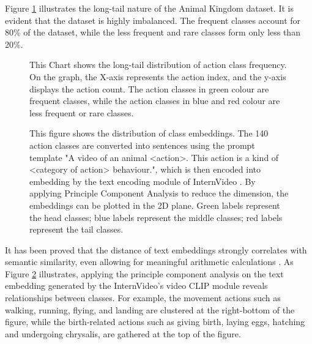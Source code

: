 Figure \ref{fig:1_1_LongTail} illustrates the long-tail nature of the Animal Kingdom dataset. It is evident that the dataset is highly imbalanced. The frequent classes account for 80\% of the dataset, while the less frequent and rare classes form only less than 20\%.

\begin{figure}[ht]
    \centering
    \resizebox{1.0\textwidth}{!}{}
    \caption[Action Classes Frequency Distribution]{This Chart shows the long-tail distribution of action class frequency. On the graph, the X-axis represents the action index, and the y-axis displays the action count. The action classes in green colour are frequent classes, while the action classes in blue and red colour are less frequent or rare classes.}
    \label{fig:1_1_LongTail}
\end{figure}

\begin{figure}[ht]
    \centering
    \caption[Class Embedding Distribution]{This figure shows the distribution of class embeddings. The 140 action classes are converted into sentences using the prompt template "A video of an animal <action>. This action is a kind of <category of action> behaviour.", which is then encoded into embedding by the text encoding module of InternVideo \parencite{wang2022internvideo}. By applying Principle Component Analysis to reduce the dimension, the embeddings can be plotted in the 2D plane. Green labels represent the head classes; blue labels represent the middle classes; red labels represent the tail classes.}
    \label{fig:1_2_ClassEmbeddingInternVideo}
\end{figure}

It has been proved that the distance of text embeddings strongly correlates with semantic similarity, even allowing for meaningful arithmetic calculations \parencite{mikolov2013efficient}. As Figure \ref{fig:1_2_ClassEmbeddingInternVideo} illustrates, applying the principle component analysis on the text embedding generated by the InternVideo's \parencite{wang2022internvideo} video CLIP module reveals relationships between classes. For example, the movement actions such as walking, running, flying, and landing are clustered at the right-bottom of the figure, while the birth-related actions such as giving birth, laying eggs, hatching and undergoing chrysalis, are gathered at the top of the figure. 

